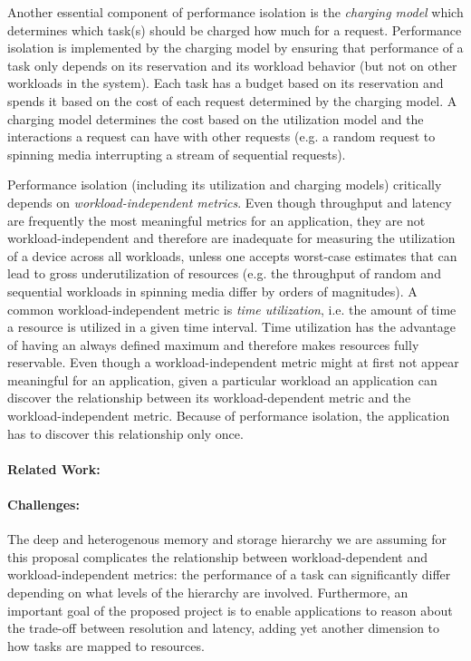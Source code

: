 Another essential component of performance isolation is the
\emph{charging model} which determines which task(s) should be
charged how much for a request. Performance isolation is implemented
by the charging model by ensuring that performance of a task only
depends on its reservation and its workload behavior (but not on
other workloads in the system). Each task has a budget based on its
reservation and spends it based on the cost of each request determined
by the charging model. A charging model determines the cost based
on the utilization model and the interactions a request can have
with other requests (e.g. a random request to spinning media
interrupting a stream of sequential requests).

Performance isolation (including its utilization and charging models)
critically depends on \emph{workload-independent metrics}. Even
though throughput and latency are frequently the most meaningful
metrics for an application, they are not workload-independent and
therefore are inadequate for measuring the utilization of a device
across all workloads, unless one accepts worst-case estimates that
can lead to gross underutilization of resources (e.g. the throughput
of random and sequential workloads in spinning media differ by
orders of magnitudes). A common workload-independent metric is
\emph{time utilization}, i.e. the amount of time a resource is
utilized in a given time interval. Time utilization has the advantage
of having an always defined maximum and therefore makes resources
fully reservable. Even though a workload-independent metric might
at first not appear meaningful for an application, given a particular
workload an application can discover the relationship between its
workload-dependent metric and the workload-independent metric.
Because of performance isolation, the application has to discover
this relationship only once.

\paragraph{Related Work:}

\paragraph{Challenges:} The deep and heterogenous memory and storage
hierarchy we are assuming for this proposal complicates the
relationship between workload-dependent and workload-independent
metrics: the performance of a task can significantly differ depending
on what levels of the hierarchy are involved. Furthermore, an
important goal of the proposed project is to enable applications
to reason about the trade-off between resolution and latency, adding
yet another dimension to how tasks are mapped to resources.

